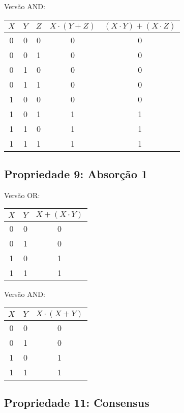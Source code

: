 \documentclass[12pt]{article}
\begin{document}
Versão AND:
\begin{center}
\begin{tabular}{|c|c|c|c|c|}
\hline
$X$  & $Y$ & $Z$ & $X \cdot (Y + Z)$ & $(X \cdot Y) + (X \cdot Z)$ \\
\hline
0 & 0 & 0 & 0 & 0 \\
0 & 0 & 1 & 0 & 0 \\
0 & 1 & 0 & 0 & 0 \\
0 & 1 & 1 & 0 & 0 \\
1 & 0 & 0 & 0 & 0 \\
1 & 0 & 1 & 1 & 1 \\
1 & 1 & 0 & 1 & 1 \\
1 & 1 & 1 & 1 & 1 \\
\hline
\end{tabular}
\end{center}

\subsection{Propriedade 9: Absorção 1}

Versão OR:
\begin{center}
\begin{tabular}{|c|c|c|}
\hline
$X$  & $Y$ & $X + (X \cdot  Y)$ \\
\hline
0 & 0 & 0 \\
0 & 1 & 0 \\
1 & 0 & 1 \\
1 & 1 & 1 \\
\hline
\end{tabular}
\end{center}

Versão AND:
\begin{center}
\begin{tabular}{|c|c|c|}
\hline
$X$  & $Y$ & $X \cdot (X + Y)$ \\
\hline
0 & 0 & 0 \\
0 & 1 & 0 \\
1 & 0 & 1 \\
1 & 1 & 1 \\
\hline
\end{tabular}
\end{center}

\subsection{Propriedade 11: Consensus}
\end{document}
